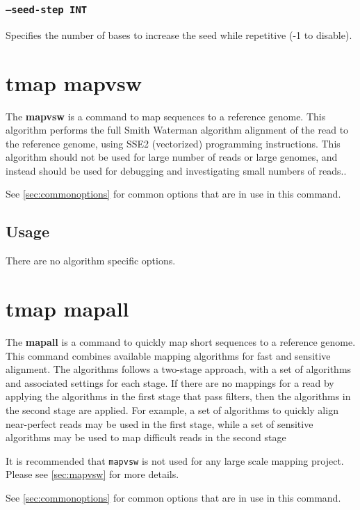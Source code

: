 \documentclass[a4paper,12pt]{book}
\newcommand{\TT}[1]{{\tt #1}} %
\newcommand{\BF}[1]{{\bf #1}} %
\begin{document}
\subsubsection{\TT{--seed-step INT}}
Specifies the number of bases to increase the seed while repetitive (-1 to disable).

\section{tmap mapvsw}
\label{sec:mapvsw}
The \BF{mapvsw} is a command to map sequences to a reference genome.
This algorithm performs the full Smith Waterman algorithm alignment of the read to the reference genome, using SSE2 (vectorized) programming instructions.
This algorithm should not be used for large number of reads or large genomes, and instead should be used for debugging and investigating small numbers of reads..

See \autoref{sec:commonoptions} for common options that are in use in this command.

\subsection{Usage}
There are no algorithm specific options.

\section{tmap mapall}
\label{sec:mapall}
The \BF{mapall} is a command to quickly map short sequences to a reference genome.
This command combines available mapping algorithms for fast and sensitive alignment.
The algorithms follows a two-stage approach, with a set of algorithms and associated settings for each stage.
If there are no mappings for a read by applying the algorithms in the first stage that pass filters, then the algorithms in the second stage are applied. 
For example, a set of algorithms to quickly align near-perfect reads may be used in the first stage, while a set of sensitive algorithms may be used to map difficult reads in the second stage

It is recommended that \TT{mapvsw} is not used for any large scale mapping project.  
Please see \autoref{sec:mapvsw} for more details.

See \autoref{sec:commonoptions} for common options that are in use in this command.
\end{document}
